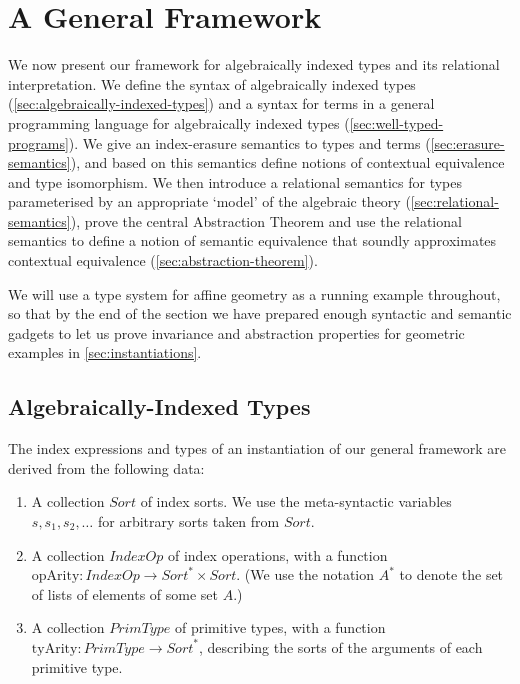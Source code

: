 \documentclass{sigplanconf}
\newcommand{\SortSet}{\mathit{Sort}}
\newcommand{\IndexOpSet}{\mathit{IndexOp}}
\newcommand{\PrimTypeSet}{\mathit{PrimType}}
\newcommand{\primTyArity}{\mathrm{tyArity}}
\newcommand{\indexOpArity}{\mathrm{opArity}}
\theoremstyle{examplestyle}
\theoremstyle{restatementstyle}
\begin{document}
\section{A General Framework}
\label{sec:a-general-framework}

We now present our framework for algebraically indexed types and its
relational interpretation.  We define the syntax of algebraically
indexed types (\autoref{sec:algebraically-indexed-types}) and a syntax
for terms in a general programming language for algebraically indexed
types (\autoref{sec:well-typed-programs}). We give an index-erasure
semantics to types and terms (\autoref{sec:erasure-semantics}), and
based on this semantics define notions of contextual equivalence and
type isomorphism. We
then introduce a relational semantics for types parameterised by an appropriate
`model' of the algebraic theory (\autoref{sec:relational-semantics}),
prove the central Abstraction Theorem
and use the relational semantics
to define a notion of semantic equivalence that soundly approximates 
contextual equivalence (\autoref{sec:abstraction-theorem}).

We will use a type system for affine geometry as a running example
throughout, so that by the end of the section we have prepared enough
syntactic and semantic gadgets to let us prove invariance
and abstraction properties for geometric examples in
\autoref{sec:instantiations}.

\subsection{Algebraically-Indexed Types}
\label{sec:algebraically-indexed-types}

The index expressions and types of an instantiation of our general
framework are derived from the following data:
\begin{enumerate}
\item A collection $\SortSet$ of index sorts. We use the
  meta-syntactic variables $s,s_1,s_2,\ldots$ for arbitrary sorts taken
  from $\SortSet$.
\item A collection $\IndexOpSet$ of index operations, with a function
  $\indexOpArity : \IndexOpSet \to \SortSet^* \times \SortSet$. (We use
  the notation $A^*$ to denote the set of lists of elements of some
  set $A$.)
\item A collection $\PrimTypeSet$ of primitive types, with a function
  $\primTyArity : \PrimTypeSet \to \SortSet^*$, describing the sorts
  of the arguments of each primitive type.
\end{enumerate}
\end{document}
